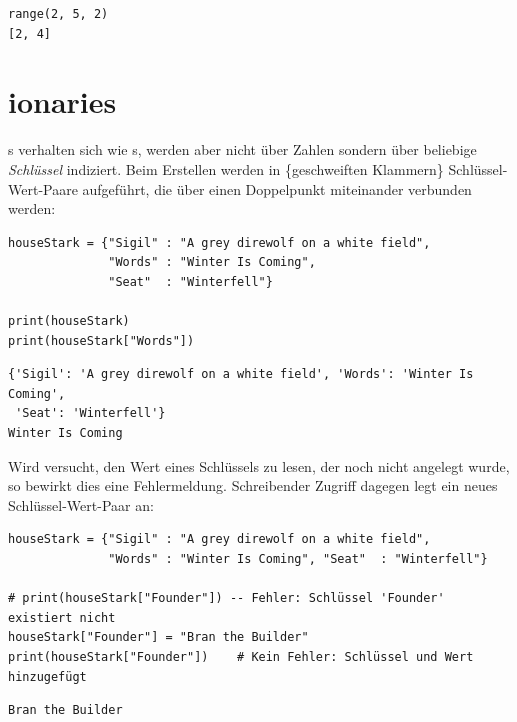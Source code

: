 \begin{cmdbox}[Ausgabe]
\begin{verbatim}
range(2, 5, 2)
[2, 4]
\end{verbatim}
\end{cmdbox}


\section{ionaries}
s verhalten sich wie s, werden aber nicht über Zahlen sondern über beliebige \emph{Schlüssel} indiziert. Beim Erstellen werden in \{geschweiften Klammern\} Schlüssel-Wert-Paare aufgeführt, die über einen Doppelpunkt miteinander verbunden werden:

\begin{codebox}
\begin{verbatim}
houseStark = {"Sigil" : "A grey direwolf on a white field",
              "Words" : "Winter Is Coming",
              "Seat"  : "Winterfell"}

print(houseStark)
print(houseStark["Words"])
\end{verbatim}
\end{codebox}

\begin{cmdbox}[Ausgabe]
\begin{verbatim}
{'Sigil': 'A grey direwolf on a white field', 'Words': 'Winter Is Coming', 
 'Seat': 'Winterfell'}
Winter Is Coming
\end{verbatim}
\end{cmdbox}

Wird versucht, den Wert eines Schlüssels zu lesen, der noch nicht angelegt wurde, so bewirkt dies eine Fehlermeldung. Schreibender Zugriff dagegen legt ein neues Schlüssel-Wert-Paar an:

\begin{codebox}
\begin{verbatim}
houseStark = {"Sigil" : "A grey direwolf on a white field",
              "Words" : "Winter Is Coming", "Seat"  : "Winterfell"}

# print(houseStark["Founder"]) -- Fehler: Schlüssel 'Founder' existiert nicht
houseStark["Founder"] = "Bran the Builder"
print(houseStark["Founder"])    # Kein Fehler: Schlüssel und Wert hinzugefügt
\end{verbatim}
\end{codebox}
%
\begin{cmdbox}[Ausgabe]
\begin{verbatim}
Bran the Builder
\end{verbatim}
\end{cmdbox}

